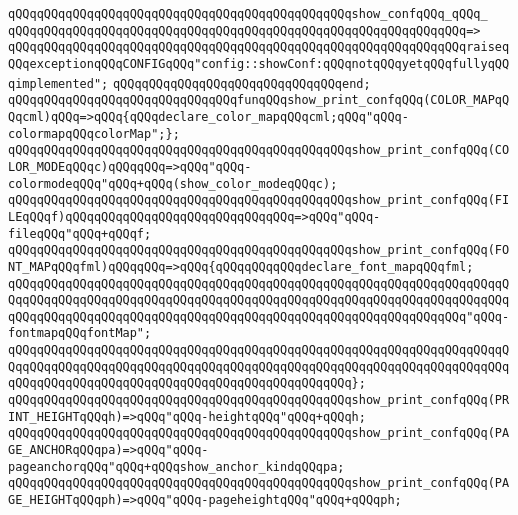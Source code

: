 \newline
\verb|qQQqqQQqqQQqqQQqqQQqqQQqqQQqqQQqqQQqqQQqqQQqqQQqshow_confqQQq_qQQq_|\newline
\verb|qQQqqQQqqQQqqQQqqQQqqQQqqQQqqQQqqQQqqQQqqQQqqQQqqQQqqQQqqQQqqQQq=>|\newline
\verb|qQQqqQQqqQQqqQQqqQQqqQQqqQQqqQQqqQQqqQQqqQQqqQQqqQQqqQQqqQQqqQQqraiseqQQqexceptionqQQqCONFIGqQQq"config::showConf:qQQqnotqQQqyetqQQqfullyqQQqimplemented";|\newline
\verb|qQQqqQQqqQQqqQQqqQQqqQQqqQQqqQQqend;|\newline
\newline
\verb|qQQqqQQqqQQqqQQqqQQqqQQqqQQqqQQqfunqQQqshow_print_confqQQq(COLOR_MAPqQQqcml)qQQq=>qQQq{qQQqdeclare_color_mapqQQqcml;qQQq"qQQq-colormapqQQqcolorMap";};|\newline
\verb|qQQqqQQqqQQqqQQqqQQqqQQqqQQqqQQqqQQqqQQqqQQqqQQqshow_print_confqQQq(COLOR_MODEqQQqc)qQQqqQQq=>qQQq"qQQq-colormodeqQQq"qQQq+qQQq(show_color_modeqQQqc);|\newline
\verb|qQQqqQQqqQQqqQQqqQQqqQQqqQQqqQQqqQQqqQQqqQQqqQQqshow_print_confqQQq(FILEqQQqf)qQQqqQQqqQQqqQQqqQQqqQQqqQQqqQQq=>qQQq"qQQq-fileqQQq"qQQq+qQQqf;|\newline
\newline
\verb|qQQqqQQqqQQqqQQqqQQqqQQqqQQqqQQqqQQqqQQqqQQqqQQqshow_print_confqQQq(FONT_MAPqQQqfml)qQQqqQQq=>qQQq{qQQqqQQqqQQqdeclare_font_mapqQQqfml;|\newline
\verb|qQQqqQQqqQQqqQQqqQQqqQQqqQQqqQQqqQQqqQQqqQQqqQQqqQQqqQQqqQQqqQQqqQQqqQQqqQQqqQQqqQQqqQQqqQQqqQQqqQQqqQQqqQQqqQQqqQQqqQQqqQQqqQQqqQQqqQQqqQQqqQQqqQQqqQQqqQQqqQQqqQQqqQQqqQQqqQQqqQQqqQQqqQQqqQQqqQQqqQQqqQQq"qQQq-fontmapqQQqfontMap";|\newline
\verb|qQQqqQQqqQQqqQQqqQQqqQQqqQQqqQQqqQQqqQQqqQQqqQQqqQQqqQQqqQQqqQQqqQQqqQQqqQQqqQQqqQQqqQQqqQQqqQQqqQQqqQQqqQQqqQQqqQQqqQQqqQQqqQQqqQQqqQQqqQQqqQQqqQQqqQQqqQQqqQQqqQQqqQQqqQQqqQQqqQQqqQQqqQQq};|\newline
\newline
\verb|qQQqqQQqqQQqqQQqqQQqqQQqqQQqqQQqqQQqqQQqqQQqqQQqshow_print_confqQQq(PRINT_HEIGHTqQQqh)=>qQQq"qQQq-heightqQQq"qQQq+qQQqh;|\newline
\verb|qQQqqQQqqQQqqQQqqQQqqQQqqQQqqQQqqQQqqQQqqQQqqQQqshow_print_confqQQq(PAGE_ANCHORqQQqpa)=>qQQq"qQQq-pageanchorqQQq"qQQq+qQQqshow_anchor_kindqQQqpa;|\newline
\verb|qQQqqQQqqQQqqQQqqQQqqQQqqQQqqQQqqQQqqQQqqQQqqQQqshow_print_confqQQq(PAGE_HEIGHTqQQqph)=>qQQq"qQQq-pageheightqQQq"qQQq+qQQqph;|\newline
